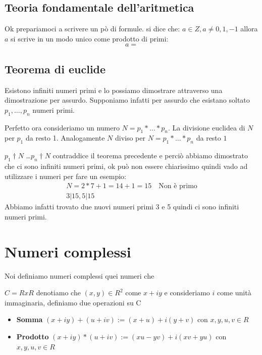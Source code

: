 \documentclass{article}
\begin{document}
\subsection{Teoria fondamentale dell'aritmetica}
Ok prepariamoci a scrivere un pò di formule. \newline
si dice che: $a \in Z, a \not = 0,1,-1$ allora $a$ si scrive in un modo unico come prodotto di primi:
\begin{equation}
a =
\end{equation}


\subsection{Teorema di euclide}
Esistono infiniti numeri primi e lo possiamo dimostrare attraverso una dimostrazione per assurdo.
Supponiamo infatti per assurdo che esistano soltato $p_1,\ldots,p_n$ numeri primi. \par
Perfetto ora consideriamo un numero $N = p_1* \ldots * p_n$.
La divisione euclidea di $N$ per $p_1$ da resto 1.
Analogamente $N$ diviso per $N = p_1* \ldots * p_n$ da resto $1$ \par

$p_1 \dag N$ \ldots  $p_n \dag N$ contraddice il teorema precedente e perciò abbiamo dimostrato che ci sono infiniti numeri primi, ok può non essere chiarissimo quindi vado ad utilizzare i numeri per fare un esempio:
\begin{align*}
        N = 2 * 7 + 1 = 14 + 1 = 15 \quad \textrm{Non è primo} \\
        3 | 15, 5 | 15
\end{align*}
Abbiamo infatti trovato due nuovi numeri primi 3 e 5 quindi ci sono infiniti numeri primi.




\newpage
\section{Numeri complessi}\label{sec:numeri_complessi}
Noi definiamo numeri complessi quei numeri che


$C = R x R$ denotiamo che $(x,y) \in R^2$ come $x + iy$ e consideriamo $i$ come unità immaginaria, definiamo due operazioni su C
\begin{itemize}
        \item \textbf{Somma} $(x + iy) + (u + iv) := (x+u) + i(y+v)$ con $x,y,u,v \in R$
        \item \textbf{Prodotto} $(x + iy) * (u + iv) := (xu - yv) + i(xv+yu)$ con $x,y,u,v \in R$
\end{itemize}
\end{document}
